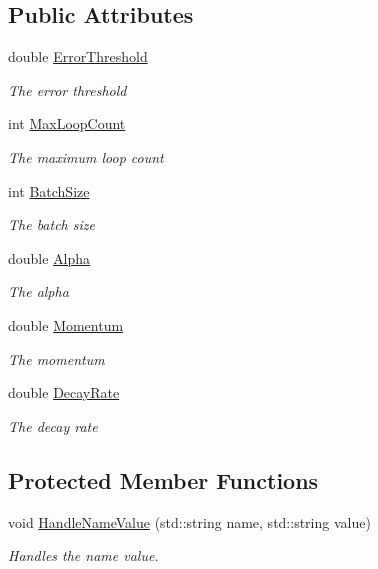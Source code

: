 \subsection*{Public Attributes}
\begin{DoxyCompactItemize}
\item 
double \hyperlink{class_backpropagation_config_a5c50a9fcfd1a06421c6a0ae3c70a3a55}{Error\+Threshold}
\begin{DoxyCompactList}\small\item\em The error threshold \end{DoxyCompactList}\item 
int \hyperlink{class_backpropagation_config_a5f13785a5b5451815c46fa475af82fac}{Max\+Loop\+Count}
\begin{DoxyCompactList}\small\item\em The maximum loop count \end{DoxyCompactList}\item 
int \hyperlink{class_backpropagation_config_a44b2e5b4975e49fbcd51a241575904d4}{Batch\+Size}
\begin{DoxyCompactList}\small\item\em The batch size \end{DoxyCompactList}\item 
double \hyperlink{class_backpropagation_config_a79edf18125f39372ef11a0f087e734ab}{Alpha}
\begin{DoxyCompactList}\small\item\em The alpha \end{DoxyCompactList}\item 
double \hyperlink{class_backpropagation_config_a8b108e7cddcbf2cc103b813708057487}{Momentum}
\begin{DoxyCompactList}\small\item\em The momentum \end{DoxyCompactList}\item 
double \hyperlink{class_backpropagation_config_a28853172211206ad458fbc72cabf252e}{Decay\+Rate}
\begin{DoxyCompactList}\small\item\em The decay rate \end{DoxyCompactList}\end{DoxyCompactItemize}
\subsection*{Protected Member Functions}
\begin{DoxyCompactItemize}
\item 
void \hyperlink{class_backpropagation_config_a375c3f21a8a3e3f834ebd098d82d1f97}{Handle\+Name\+Value} (std\+::string name, std\+::string value)
\begin{DoxyCompactList}\small\item\em Handles the name value. \end{DoxyCompactList}\end{DoxyCompactItemize}


